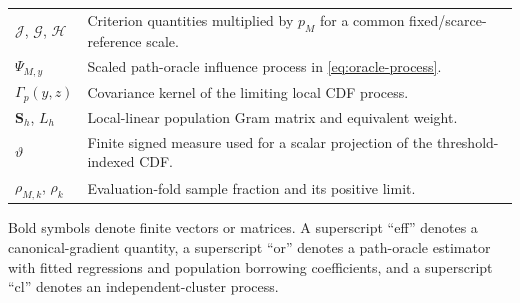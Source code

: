 \begin{center}
\begin{tabular}{>{\raggedright\arraybackslash}p{3.0cm}>{\raggedright\arraybackslash}p{10.5cm}}
$\mathcal J$, $\mathcal G$, $\mathcal H$ & Criterion quantities multiplied by $p_M$ for a common fixed/scarce-reference scale. \\
$\Psi_{M,y}$ & Scaled path-oracle influence process in \eqref{eq:oracle-process}. \\
$\Gamma_p(y,z)$ & Covariance kernel of the limiting local CDF process. \\
$\mathbf S_h$, $L_h$ & Local-linear population Gram matrix and equivalent weight. \\
$\vartheta$ & Finite signed measure used for a scalar projection of the threshold-indexed CDF. \\
$\rho_{M,k}$, $\rho_k$ & Evaluation-fold sample fraction and its positive limit. \\
\bottomrule
\end{tabular}
\end{center}

Bold symbols denote finite vectors or matrices. A superscript ``eff'' denotes a canonical-gradient quantity, a superscript ``or'' denotes a path-oracle estimator with fitted regressions and population borrowing coefficients, and a superscript ``cl'' denotes an independent-cluster process.
